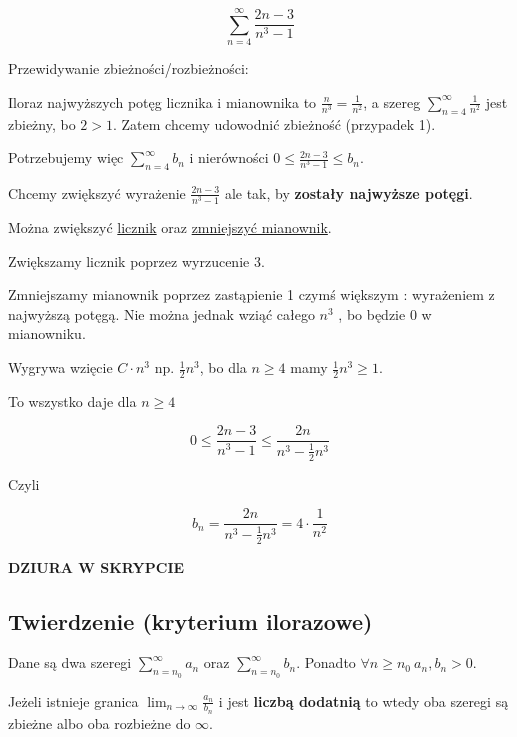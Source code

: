\begin{przyklad}

$$ \sum\limits_{n = 4}^{\infty} \frac{2n - 3}{n^3 - 1} $$

Przewidywanie zbieżności/rozbieżności:

Iloraz najwyższych potęg licznika i mianownika to $ \frac{n}{n^3} = \frac{1}{n^2} $, a szereg $ \sum\limits_{n = 4}^{\infty} \frac{1}{n^2} $
jest zbieżny, bo $ 2 > 1 $. Zatem chcemy udowodnić zbieżność (przypadek 1).

Potrzebujemy więc $ \sum\limits_{n = 4}^{\infty} b_n $ i nierówności $ 0 \leq \frac{2n - 3}{n^3 - 1} \leq b_n $.

Chcemy zwiększyć wyrażenie $ \frac{2n - 3}{n^3 - 1} $ ale tak, by \textbf{zostały najwyższe potęgi}.

Można zwiększyć \underline{licznik} oraz \underline{zmniejszyć mianownik}.

Zwiększamy licznik poprzez wyrzucenie 3.

Zmniejszamy mianownik poprzez zastąpienie 1 czymś większym : wyrażeniem z najwyższą potęgą. Nie można jednak wziąć całego $n^3$
, bo będzie 0 w mianowniku.

Wygrywa wzięcie $ C \cdot n^3 $ np. $ \frac{1}{2} n^3 $, bo dla $ n \geq 4 $ mamy $ \frac{1}{2} n^3 \geq 1 $.

To wszystko daje dla $ n \geq 4 $

$$ 0 \leq \frac{2n - 3}{n^3 - 1} \leq \frac{2n}{n^3 - \frac{1}{2} n^3} $$

Czyli

$$ b_n = \frac{2n}{n^3 - \frac{1}{2}n^3} = 4 \cdot \frac{1}{n^2} $$

\textbf{DZIURA W SKRYPCIE}
\end{przyklad}

\subsection*{Twierdzenie (kryterium ilorazowe)}

Dane są dwa szeregi $ \sum\limits_{n = n_0}^{\infty} a_n $ oraz $ \sum\limits_{n = n_0}^{\infty} b_n $.
Ponadto $ \forall n \geq n_0 \ a_n, b_n > 0 $.

Jeżeli istnieje granica $ \lim_{n \to \infty} \frac{a_n}{b_n} $ i jest \textbf{liczbą dodatnią} to wtedy oba
szeregi są zbieżne albo oba rozbieżne do $\infty$. \\

